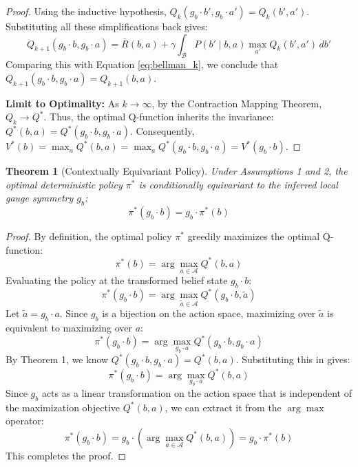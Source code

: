\documentclass[12pt]{article}
\newtheorem{theorem}{Theorem}
\begin{document}
\begin{proof}
Using the inductive hypothesis, $Q_k(g_b \cdot b', g_b \cdot a') = Q_k(b', a')$. Substituting all these simplifications back gives:
\begin{equation*}
    Q_{k+1}(g_b \cdot b, g_b \cdot a) = \bar{R}(b, a) + \gamma \int_{\mathcal{B}} P(b' \mid b, a) \max_{a'} Q_k(b', a') \, db'
\end{equation*}
Comparing this with Equation \ref{eq:bellman_k}, we conclude that $Q_{k+1}(g_b \cdot b, g_b \cdot a) = Q_{k+1}(b, a)$.

\textbf{Limit to Optimality:} As $k \rightarrow \infty$, by the Contraction Mapping Theorem, $Q_k \rightarrow Q^*$. Thus, the optimal Q-function inherits the invariance: $Q^*(b, a) = Q^*(g_b \cdot b, g_b \cdot a)$. Consequently, $V^*(b) = \max_a Q^*(b, a) = \max_a Q^*(g_b \cdot b, g_b \cdot a) = V^*(g_b \cdot b)$.
\end{proof}


\begin{theorem}[Contextually Equivariant Policy]
Under Assumptions 1 and 2, the optimal deterministic policy $\pi^*$ is conditionally equivariant to the inferred local gauge symmetry $g_b$:
\begin{equation}
    \pi^*(g_b \cdot b) = g_b \cdot \pi^*(b)
\end{equation}
\end{theorem}

\begin{proof}
By definition, the optimal policy $\pi^*$ greedily maximizes the optimal Q-function:
\begin{equation*}
    \pi^*(b) = \arg\max_{a \in \mathcal{A}} Q^*(b, a)
\end{equation*}
Evaluating the policy at the transformed belief state $g_b \cdot b$:
\begin{equation*}
    \pi^*(g_b \cdot b) = \arg\max_{\tilde{a} \in \mathcal{A}} Q^*(g_b \cdot b, \tilde{a})
\end{equation*}
Let $\tilde{a} = g_b \cdot a$. Since $g_b$ is a bijection on the action space, maximizing over $\tilde{a}$ is equivalent to maximizing over $a$:
\begin{equation*}
    \pi^*(g_b \cdot b) = \arg\max_{g_b \cdot a} Q^*(g_b \cdot b, g_b \cdot a)
\end{equation*}
By Theorem 1, we know $Q^*(g_b \cdot b, g_b \cdot a) = Q^*(b, a)$. Substituting this in gives:
\begin{equation*}
    \pi^*(g_b \cdot b) = \arg\max_{g_b \cdot a} Q^*(b, a)
\end{equation*}
Since $g_b$ acts as a linear transformation on the action space that is independent of the maximization objective $Q^*(b, a)$, we can extract it from the $\arg\max$ operator:
\begin{equation*}
    \pi^*(g_b \cdot b) = g_b \cdot \left( \arg\max_{a \in \mathcal{A}} Q^*(b, a) \right) = g_b \cdot \pi^*(b)
\end{equation*}
This completes the proof.
\end{proof}
\end{document}
